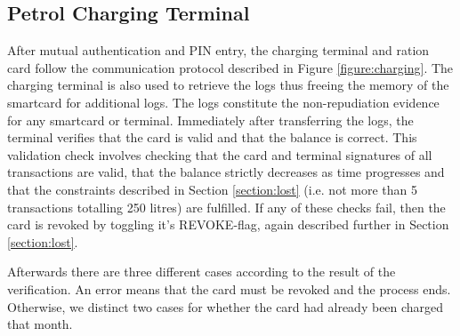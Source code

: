 \documentclass[a4paper,10pt]{llncs}
\begin{document}
\subsection{Petrol Charging Terminal}
\label{subsection:chargingterminal}
After mutual authentication and PIN entry, the charging terminal and ration card follow the communication protocol described in Figure \ref{figure:charging}. The charging terminal is also used to retrieve the logs thus freeing the memory of the smartcard for additional logs. The logs constitute the non-repudiation evidence for any smartcard or terminal. Immediately after transferring the logs, the terminal verifies that the card is valid and that the balance is correct. This validation check involves checking that the card and terminal signatures of all transactions are valid, that the balance strictly decreases as time progresses and that the constraints described in Section \ref{section:lost} (i.e. not more than 5 transactions totalling 250 litres) are fulfilled. If any of these checks fail, then the card is revoked by toggling it's REVOKE-flag, again described further in Section \ref{section:lost}.

Afterwards there are three different cases according to the result of the verification. An error means that the card must be revoked and the process ends. Otherwise, we distinct two cases for whether the card had already been charged that month.

\usetikzlibrary{matrix,shapes,arrows,positioning,chains, calc}
\end{document}
